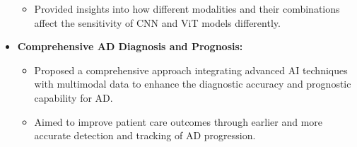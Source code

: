 \begin{itemize}
\begin{itemize}
        \item Provided insights into how different modalities and their combinations affect the sensitivity of CNN and ViT models differently.
    \end{itemize}
    \item \textbf{Comprehensive AD Diagnosis and Prognosis:}
    \begin{itemize}
        \item Proposed a comprehensive approach integrating advanced AI techniques with multimodal data to enhance the diagnostic accuracy and prognostic capability for AD.
        \item Aimed to improve patient care outcomes through earlier and more accurate detection and tracking of AD progression.
    \end{itemize}
\end{itemize}

 